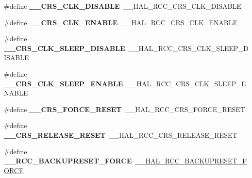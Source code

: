 \begin{DoxyCompactItemize}
\item 
\#define {\bfseries \+\_\+\+\_\+\+C\+R\+S\+\_\+\+C\+L\+K\+\_\+\+D\+I\+S\+A\+B\+LE}~\+\_\+\+\_\+\+H\+A\+L\+\_\+\+R\+C\+C\+\_\+\+C\+R\+S\+\_\+\+C\+L\+K\+\_\+\+D\+I\+S\+A\+B\+LE\hypertarget{group___h_a_l___r_c_c___aliased_ga84ae58b90f4c98fd88358a01820a8758}{}\label{group___h_a_l___r_c_c___aliased_ga84ae58b90f4c98fd88358a01820a8758}

\item 
\#define {\bfseries \+\_\+\+\_\+\+C\+R\+S\+\_\+\+C\+L\+K\+\_\+\+E\+N\+A\+B\+LE}~\+\_\+\+\_\+\+H\+A\+L\+\_\+\+R\+C\+C\+\_\+\+C\+R\+S\+\_\+\+C\+L\+K\+\_\+\+E\+N\+A\+B\+LE\hypertarget{group___h_a_l___r_c_c___aliased_ga52eccec80baca3fd78a15dd06cd38e26}{}\label{group___h_a_l___r_c_c___aliased_ga52eccec80baca3fd78a15dd06cd38e26}

\item 
\#define {\bfseries \+\_\+\+\_\+\+C\+R\+S\+\_\+\+C\+L\+K\+\_\+\+S\+L\+E\+E\+P\+\_\+\+D\+I\+S\+A\+B\+LE}~\+\_\+\+\_\+\+H\+A\+L\+\_\+\+R\+C\+C\+\_\+\+C\+R\+S\+\_\+\+C\+L\+K\+\_\+\+S\+L\+E\+E\+P\+\_\+\+D\+I\+S\+A\+B\+LE\hypertarget{group___h_a_l___r_c_c___aliased_ga109eb744a73866e3b6acd86d7a3078b6}{}\label{group___h_a_l___r_c_c___aliased_ga109eb744a73866e3b6acd86d7a3078b6}

\item 
\#define {\bfseries \+\_\+\+\_\+\+C\+R\+S\+\_\+\+C\+L\+K\+\_\+\+S\+L\+E\+E\+P\+\_\+\+E\+N\+A\+B\+LE}~\+\_\+\+\_\+\+H\+A\+L\+\_\+\+R\+C\+C\+\_\+\+C\+R\+S\+\_\+\+C\+L\+K\+\_\+\+S\+L\+E\+E\+P\+\_\+\+E\+N\+A\+B\+LE\hypertarget{group___h_a_l___r_c_c___aliased_ga021f37b26826b71eb190799dca3c9c8e}{}\label{group___h_a_l___r_c_c___aliased_ga021f37b26826b71eb190799dca3c9c8e}

\item 
\#define {\bfseries \+\_\+\+\_\+\+C\+R\+S\+\_\+\+F\+O\+R\+C\+E\+\_\+\+R\+E\+S\+ET}~\+\_\+\+\_\+\+H\+A\+L\+\_\+\+R\+C\+C\+\_\+\+C\+R\+S\+\_\+\+F\+O\+R\+C\+E\+\_\+\+R\+E\+S\+ET\hypertarget{group___h_a_l___r_c_c___aliased_ga9e67e2882448dc0477a13ff77b08ae93}{}\label{group___h_a_l___r_c_c___aliased_ga9e67e2882448dc0477a13ff77b08ae93}

\item 
\#define {\bfseries \+\_\+\+\_\+\+C\+R\+S\+\_\+\+R\+E\+L\+E\+A\+S\+E\+\_\+\+R\+E\+S\+ET}~\+\_\+\+\_\+\+H\+A\+L\+\_\+\+R\+C\+C\+\_\+\+C\+R\+S\+\_\+\+R\+E\+L\+E\+A\+S\+E\+\_\+\+R\+E\+S\+ET\hypertarget{group___h_a_l___r_c_c___aliased_gaee653fe1285dc71584a287f1752deef6}{}\label{group___h_a_l___r_c_c___aliased_gaee653fe1285dc71584a287f1752deef6}

\item 
\#define {\bfseries \+\_\+\+\_\+\+R\+C\+C\+\_\+\+B\+A\+C\+K\+U\+P\+R\+E\+S\+E\+T\+\_\+\+F\+O\+R\+CE}~\hyperlink{group___r_c_c___internal___r_t_c___clock___configuration_ga3bf7da608ff985873ca8e248fb1dc4f0}{\+\_\+\+\_\+\+H\+A\+L\+\_\+\+R\+C\+C\+\_\+\+B\+A\+C\+K\+U\+P\+R\+E\+S\+E\+T\+\_\+\+F\+O\+R\+CE}\hypertarget{group___h_a_l___r_c_c___aliased_ga717fc2d87d7b55be19d505a1c55507c5}{}\label{group___h_a_l___r_c_c___aliased_ga717fc2d87d7b55be19d505a1c55507c5}


\end{DoxyCompactItemize}
